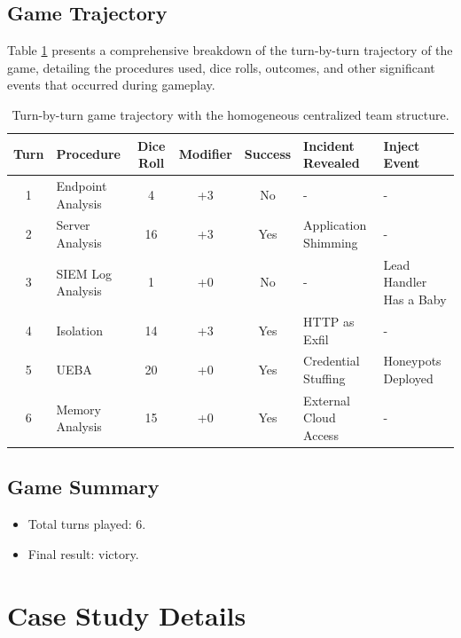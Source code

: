 \documentclass[letterpaper]{article} %
\begin{document}
\subsection{Game Trajectory}

Table \ref{tab:game-trajectory} presents a comprehensive breakdown of the turn-by-turn trajectory of the game, detailing the procedures used, dice rolls, outcomes, and other significant events that occurred during gameplay.

\begin{table}[h!]
    \centering
    \caption{Turn-by-turn game trajectory with the homogeneous centralized team structure.}
    \begin{tabular}{clcccll}
        \toprule
        \textbf{Turn} & \textbf{Procedure} & \textbf{Dice Roll} & \textbf{Modifier} & \textbf{Success} & \textbf{Incident Revealed} & \textbf{Inject Event} \\
        \midrule
        1 & Endpoint Analysis & 4 & +3 & No & - & - \\
        2 & Server Analysis & 16 & +3 & Yes & Application Shimming & - \\
        3 & SIEM Log Analysis & 1 & +0 & No & - & Lead Handler Has a Baby \\
        4 & Isolation & 14 & +3 & Yes & HTTP as Exfil & - \\
        5 & UEBA & 20 & +0 & Yes & Credential Stuffing & Honeypots Deployed \\
        6 & Memory Analysis & 15 & +0 & Yes & External Cloud Access & - \\
        \bottomrule
    \end{tabular}
    \label{tab:game-trajectory}
\end{table}

\subsection{Game Summary}

\begin{itemize}
    \item Total turns played: 6.
    \item Final result: victory.
\end{itemize}

\section{Case Study Details}
\label{sec:case-study-details}
\end{document}
